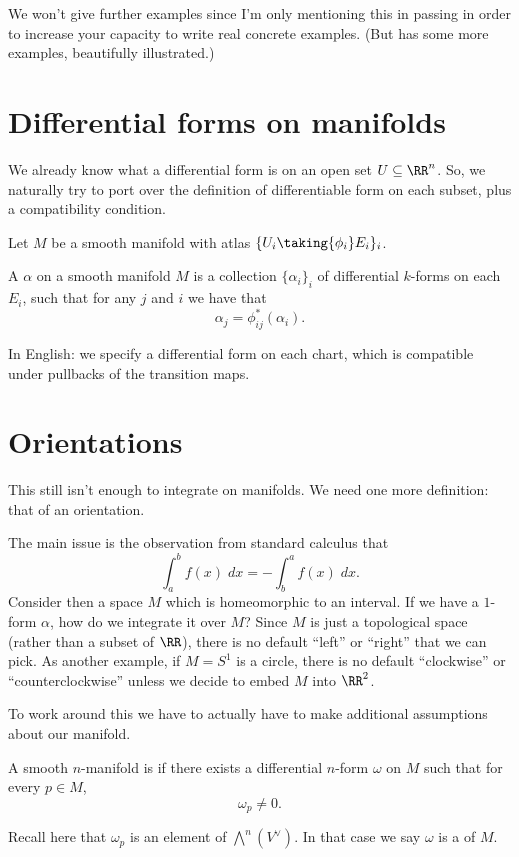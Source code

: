 We won't give further examples
since I'm only mentioning this in passing
in order to increase your capacity to write real concrete examples.
(But \cite[Chapter 6.2]{ref:manifolds} has some more examples,
beautifully illustrated.)

\section{Differential forms on manifolds}
We already know what a differential form is on an open set $U \subseteq \RR^n$.
So, we naturally try to port over the definition of
differentiable form on each subset, plus a compatibility condition.

Let $M$ be a smooth manifold with atlas $\{ U_i \taking{\phi_i} E_i \}_i$.

\begin{definition}
	A  $\alpha$ on a smooth manifold $M$
	is a collection $\{\alpha_i\}_i$ of differential $k$-forms on each $E_i$,
	such that for any $j$ and $i$ we have that
	\[ \alpha_j = \phi_{ij}^\ast(\alpha_i). \]
\end{definition}
In English: we specify a differential form on each chart,
which is compatible under pullbacks of the transition maps.

\section{Orientations}

This still isn't enough to integrate on manifolds.
We need one more definition: that of an orientation.

The main issue is the observation from standard calculus that
\[ \int_a^b f(x) \; dx = - \int_b^a f(x) \; dx. \]
Consider then a space $M$ which is homeomorphic to an interval.
If we have a $1$-form $\alpha$, how do we integrate it over $M$?
Since $M$ is just a topological space (rather than a subset of $\RR$),
there is no default ``left'' or ``right'' that we can pick.
As another example, if $M = S^1$ is a circle, there is
no default ``clockwise'' or ``counterclockwise'' unless we decide
to embed $M$ into $\RR^2$.

To work around this we have to actually have to
make additional assumptions about our manifold.
\begin{definition}
	A smooth $n$-manifold is  if
	there exists a differential $n$-form $\omega$ on $M$
	such that for every $p \in M$,
	\[ \omega_p \neq 0. \]
\end{definition}
Recall here that $\omega_p$ is an element of $\bigwedge^n(V^\vee)$.
In that case we say $\omega$ is a  of $M$.

